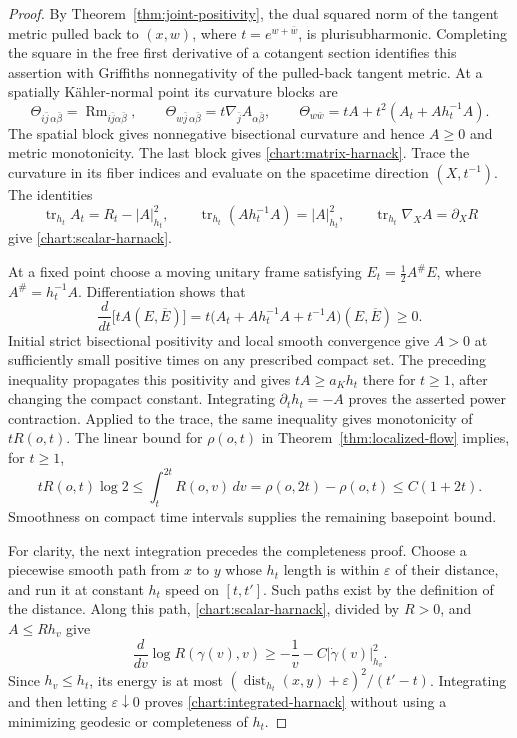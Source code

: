 \documentclass[11pt]{article}
\theoremstyle{definition}
\theoremstyle{remark}
\newcommand{\eps}{\varepsilon}
\DeclareMathOperator{\Rm}{Rm}
\DeclareMathOperator{\tr}{tr}
\DeclareMathOperator{\dist}{dist}
\numberwithin{equation}{section}
\begin{document}
\begin{proof}
By Theorem~\ref{thm:joint-positivity}, the dual squared norm of the
tangent metric pulled back to $(x,w)$, where $t=e^{w+\bar w}$, is
plurisubharmonic.  Completing the square in the free first derivative
of a cotangent section identifies this assertion with Griffiths
nonnegativity of the pulled-back tangent metric.  At a spatially
K\"ahler-normal point its curvature blocks are
\[
 \Theta_{i\bar j\,\alpha\bar\beta}
   =\Rm_{i\bar j\alpha\bar\beta},\qquad
 \Theta_{w\bar j\,\alpha\bar\beta}
   =t\nabla_{\bar j}A_{\alpha\bar\beta},\qquad
 \Theta_{w\bar w}=tA+t^2(A_t+A h_t^{-1}A).
\]
The spatial block gives nonnegative bisectional curvature and hence
$A\ge0$ and metric monotonicity.  The last block gives
\eqref{chart:matrix-harnack}.  Trace the curvature in its fiber
indices and evaluate on the spacetime direction $(X,t^{-1})$.
The identities
\[
 \tr_{h_t}A_t=R_t-|A|_{h_t}^2,
 \qquad \tr_{h_t}(A h_t^{-1}A)=|A|_{h_t}^2,
 \qquad \tr_{h_t}\nabla_X A=\partial_XR
\]
give \eqref{chart:scalar-harnack}.

At a fixed point choose a moving unitary frame satisfying
$E_t=\tfrac12 A^{\#}E$, where $A^{\#}=h_t^{-1}A$.
Differentiation shows that
\[
 \frac{d}{dt}\bigl[tA(E,\overline E)\bigr]
   =t\bigl(A_t+A h_t^{-1}A+t^{-1}A\bigr)(E,\overline E)\ge0.
\]
Initial strict bisectional positivity and local smooth convergence
give $A>0$ at sufficiently small positive times on any prescribed
compact set.  The preceding inequality propagates this positivity
and gives $tA\ge a_Kh_t$ there for $t\ge1$, after changing the compact
constant.  Integrating $\partial_t h_t=-A$ proves the asserted
power contraction.  Applied to the trace, the same inequality gives
monotonicity of $tR(o,t)$.  The linear bound for $\rho(o,t)$ in
Theorem~\ref{thm:localized-flow} implies, for $t\ge1$,
\[
 tR(o,t)\log2
 \le\int_t^{2t}R(o,v)\,dv
 =\rho(o,2t)-\rho(o,t)\le C(1+2t).
\]
Smoothness on compact time intervals supplies the remaining
basepoint bound.

For clarity, the next integration precedes the completeness proof.
Choose a piecewise smooth path from $x$ to $y$ whose $h_t$ length is
within $\eps$ of their distance, and run it at constant $h_t$ speed
on $[t,t']$.  Such paths exist by the definition of the distance.
Along this path, \eqref{chart:scalar-harnack}, divided by $R>0$,
and $A\le Rh_v$ give
\[
 \frac{d}{dv}\log R(\gamma(v),v)
 \ge-\frac1v-C|\dot\gamma(v)|_{h_v}^2.
\]
Since $h_v\le h_t$, its energy is at most
$(\dist_{h_t}(x,y)+\eps)^2/(t'-t)$.  Integrating and then letting
$\eps\downarrow0$ proves \eqref{chart:integrated-harnack} without
using a minimizing geodesic or completeness of $h_t$.


\end{proof}
\end{document}
